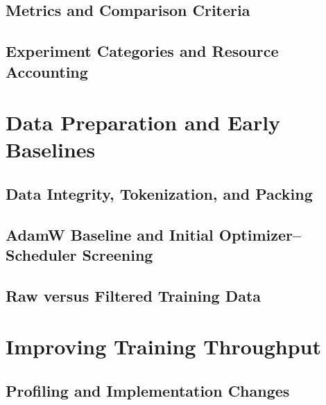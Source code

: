 \subsection{Metrics and Comparison Criteria}
\subsection{Experiment Categories and Resource Accounting}

\section{Data Preparation and Early Baselines}
\label{sec:baseline}
\subsection{Data Integrity, Tokenization, and Packing}
\subsection{AdamW Baseline and Initial Optimizer--Scheduler Screening}
\subsection{Raw versus Filtered Training Data}

\section{Improving Training Throughput}
\label{sec:systems}
\subsection{Profiling and Implementation Changes}
